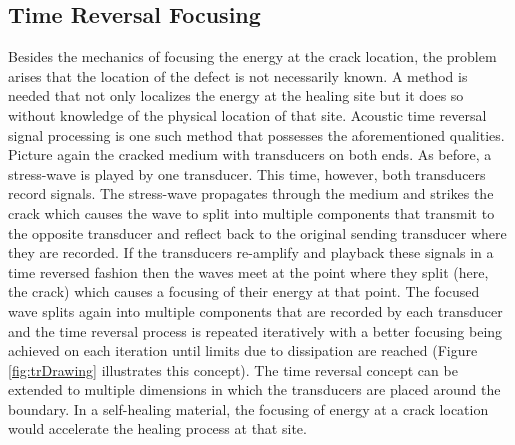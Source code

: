 \subsection{Time Reversal Focusing}
Besides the mechanics of focusing the energy at the crack location, the problem arises that the location of the defect is not necessarily known. A method is needed that not only localizes the energy at the healing site but it does so without knowledge of the physical location of that site. Acoustic time reversal signal processing is one such method that possesses the aforementioned qualities. Picture again the cracked medium with transducers on both ends. As before, a stress-wave is played by one transducer. This time, however, both transducers record signals. The stress-wave propagates through the medium and strikes the crack which causes the wave to split into multiple components that transmit to the opposite transducer and reflect back to the original sending transducer where they are recorded. If the transducers re-amplify and playback these signals in a time reversed fashion then the waves meet at the point where they split (here, the crack) which causes a focusing of their energy at that point. The focused wave splits again into multiple components that are recorded by each transducer and the time reversal process is repeated iteratively with a better focusing being achieved on each iteration until limits due to dissipation are reached (Figure \ref{fig:trDrawing} illustrates this concept). The time reversal concept can be extended to multiple dimensions in which the transducers are placed around the boundary. In a self-healing material, the focusing of energy at a crack location would accelerate the healing process at that site.

